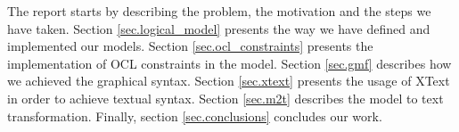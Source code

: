 \noindent The report starts by describing the problem, the
motivation and the steps we have taken. Section \ref{sec.logical_model}
presents the way we have defined and implemented our models. Section
\ref{sec.ocl_constraints} presents the implementation of OCL constraints in the
model. Section \ref{sec.gmf} describes how we achieved the graphical syntax.
Section \ref{sec.xtext} presents the usage of XText in order to achieve textual
syntax. Section \ref{sec.m2t} describes the model to text transformation.
Finally, section \ref{sec.conclusions} concludes our work.
